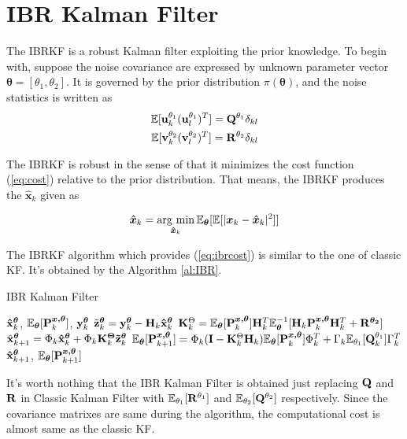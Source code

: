 \section{IBR Kalman Filter\label{sec: ibr}}

The IBRKF is a robust Kalman filter exploiting the prior knowledge. To begin with, suppose the noise covariance are expressed by unknown parameter vector $\bm{\theta}=[\theta_1, \theta_2]$. It is governed by the prior distribution $\pi(\bm{\theta})$, and the noise statistics is written as
\begin{align}
    \mathbb{E}[{\bf u}^{\theta_1}_k ({\bf u}^{\theta_1}_l)^T]={\bf Q}^{\theta_1}\delta_{kl} \\
    \mathbb{E}[{\bf v}^{\theta_2}_k ({\bf v}^{\theta_2}_l)^T]={\bf R}^{\theta_2}\delta_{kl} 
\end{align}

The IBRKF is robust in the sense of that it minimizes the cost function (\ref{eq:cost}) relative to the prior distribution. That means, the IBRKF produces the $\bm{\hat x}_k$ given as

\begin{equation} \label{eq:ibrcost}
    \bm{\hat x}_k = \mathop{\rm arg~min}\limits_{\bm{\hat x}_k}\mathbb{E}_{\bm{\theta}}[\mathbb{E}[|\bm{x}_k-\bm{\hat x}_k|^2]]
\end{equation}

The IBRKF algorithm which provides (\ref{eq:ibrcost}) is similar to the one of classic KF. It's obtained by the Algorithm \ref{al:IBR}.

\begin{algorithm}[]
\caption{IBR Kalman Filter}
\begin{algorithmic}[1]
    \label{al:IBR}
\REQUIRE ${\bf \hat x}^{\bm{\theta}}_k$, $\mathbb{E}_{\bm{\theta}}[{\bf P}^{\bm{x, \theta}}_{k}]$, ${\bf y}^{\bm{\theta}}_k$
\STATE $\tilde {\bf z}^{\bm{\theta}}_k = {\bf y}^{\bm{\theta}}_k - {\bf H}_k{\bf \hat x}^{\bm{\theta}}_k$
\STATE ${\bf K}^{\Theta}_k = \mathbb{E}_{\bm{\theta}}[{\bf P}^{\bm{x, \theta}}_k]{\bf H}^T_k\mathbb{E}_{\bm{\theta}}^{-1}[{\bf H}_k{\bf P}^{\bm{x, \theta}}_k{\bf H}^T_k+{\bf R}^{\bm{\theta_2}}]$
\STATE $\hat{\bf x}^{\bm{\theta}}_{k+1} = {\Phi}_k{\bf \hat x}^{\bm{\theta}}_k+{\Phi}_k{\bf K}^{\bm{\Theta}}_k{\bf \tilde z}^{\bm{\theta}}_k$
\STATE $\mathbb{E}_{\bm\theta}[{\bf P}^{\bm{x, \theta}}_{k+1}] = {\Phi}_k({\bf I}-{\bf K}^{\Theta}_k{\bf H}_k)\mathbb{E}_{\bm\theta}[{\bf P}^{\bm{x, \theta}}_k]{\Phi}^T_k + {\Gamma}_k\mathbb{E}_{\theta_1}[{\bf Q}^{\theta_1}_k]{\Gamma}_k^T$
\ENSURE ${\bf \hat x}^{\bm{\theta}}_{k+1}$, $\mathbb{E}_{\bm\theta}[{\bf P}^{\bm{x, \theta}}_{k+1}]$
\end{algorithmic}
\end{algorithm}

It's worth nothing that the IBR Kalman Filter is obtained just replacing ${\bf Q}$ and ${\bf R}$ in Classic Kalman Filter with $\mathbb{E}_{\theta_1}[{\bf R}^{\theta_1}]$ and $\mathbb{E}_{\theta_2}[{\bf Q}^{\theta_2}]$ respectively. Since the covariance matrixes are same during the algorithm, the computational cost is almost same as the classic KF. 